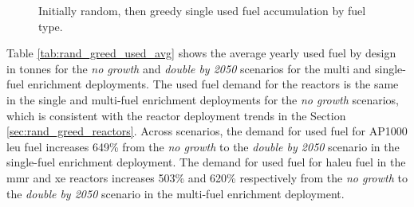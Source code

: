   \begin{figure}[H]
    \hfill
    \caption{Initially random, then greedy single used fuel accumulation by fuel type.}
    \label{fig:rand_greed_of_used}
  \end{figure}


Table \ref{tab:rand_greed_used_avg} shows the average yearly used fuel by design in tonnes for the \textit{no growth} and \textit{double by 2050} scenarios for the multi and single-fuel enrichment deployments. The used fuel demand for the reactors is the same in the single and multi-fuel enrichment deployments for the \textit{no growth} scenarios, which is consistent with the reactor deployment trends in the Section \ref{sec:rand_greed_reactors}. Across scenarios, the demand for used fuel for AP1000 \gls{leu} fuel increases 649\% from the \textit{no growth} to the \textit{double by 2050} scenario in the single-fuel enrichment deployment. The demand for used fuel for \gls{haleu} fuel in the \gls{mmr} and \gls{xe} reactors increases 503\% and 620\% respectively from the \textit{no growth} to the \textit{double by 2050} scenario in the multi-fuel enrichment deployment.

